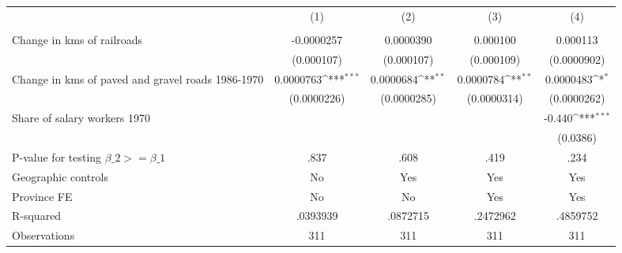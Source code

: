 {
\def\sym#1{\ifmmode^{#1}\else\(^{#1}\)\fi}
\begin{tabular}{l*{4}{c}}
\hline\hline
                &\multicolumn{1}{c}{(1)}&\multicolumn{1}{c}{(2)}&\multicolumn{1}{c}{(3)}&\multicolumn{1}{c}{(4)}\\
                &\multicolumn{1}{c}{}&\multicolumn{1}{c}{}&\multicolumn{1}{c}{}&\multicolumn{1}{c}{}\\
\hline
Change in kms of railroads&-0.0000257         &0.0000390         & 0.000100         & 0.000113         \\
                &(0.000107)         &(0.000107)         &(0.000109)         &(0.0000902)         \\
[1em]
Change in kms of paved and gravel roads 1986-1970&0.0000763\sym{***}&0.0000684\sym{**} &0.0000784\sym{**} &0.0000483\sym{*}  \\
                &(0.0000226)         &(0.0000285)         &(0.0000314)         &(0.0000262)         \\
[1em]
Share of salary workers 1970&                  &                  &                  &   -0.440\sym{***}\\
                &                  &                  &                  & (0.0386)         \\
\hline
P-value for testing $\beta\_{2} >= \beta\_{1}$&     .837         &     .608         &     .419         &     .234         \\
Geographic controls&       No         &      Yes         &      Yes         &      Yes         \\
Province FE     &       No         &       No         &      Yes         &      Yes         \\
R-squared       & .0393939         & .0872715         & .2472962         & .4859752         \\
Observations    &      311         &      311         &      311         &      311         \\
\hline\hline
\end{tabular}
}
